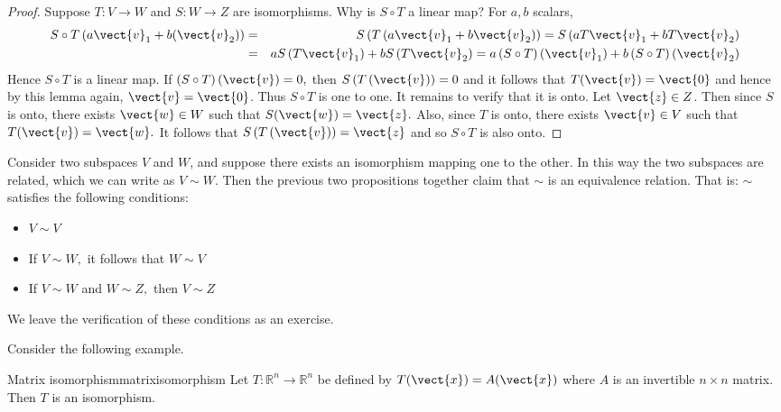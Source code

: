\begin{proof}
Suppose $T:V\rightarrow W$ and  $S:W\rightarrow Z$ are isomorphisms. Why is $S\circ T$ a linear map?
For $a,b$ scalars,
\begin{eqnarray*}
S\circ T\left( a\vect{v}_{1}+b(\vect{v}_{2})\right) 
&=& S\left( T\left(a\vect{v}_{1}+b\vect{v}_{2}\right) \right) =S\left( aT\vect{v}_{1}+bT\vect{v}_{2}\right) \\
&=&aS\left( T\vect{v}_{1}\right) +bS\left( T\vect{v}_{2}\right) = a\left( S\circ
T\right) \left( \vect{v}_{1}\right) +b\left( S\circ T\right) \left( \vect{v}_{2}\right)
\end{eqnarray*}
Hence $S\circ T$ is a linear map. If $\left( S\circ T\right) \left( \vect{v} \right)
=0,$ then $S\left( T\left(  \vect{v} \right) \right) =0$ and it follows that $T(\vect{v})=\vect{0}$ and hence by this lemma again, $\vect{v}=\vect{0}$. Thus $S\circ
T $ is one to one. It remains to verify that it is onto. Let $\vect{z} \in Z$. Then
since $S$ is onto, there exists $\vect{w} \in W$ such that $S(\vect{w})=\vect{z}.$ Also, since $T$
is onto, there exists $\vect{v}\in V$ such that $T(\vect{v})=\vect{w}.$ It follows that $S\left(
T\left( \vect{v}\right) \right) =\vect{z}$ and so $S\circ T$ is also onto.
\end{proof}

Consider two subspaces $V$ and $W$, and suppose there exists an isomorphism mapping one to the other. In this way the two subspaces are related, which we can write as $V \sim W$. Then the previous two propositions together claim that $\sim $ is an equivalence relation. That is: $\sim $
satisfies the following conditions:

\begin{itemize}
\item $V\sim V$

\item If $V\sim W,$ it follows that $W\sim V$

\item If $V\sim W$ and $W\sim Z,$ then $V\sim Z$
\end{itemize}

We leave the verification of these conditions as an exercise.

Consider the following example. 

\begin{example}{Matrix isomorphism}{matrixisomorphism}
Let $T:\mathbb{R}^{n}\rightarrow \mathbb{R}^{n}$ be defined by $T(\vect{x}) = A(\vect{x})$ where $A$ is an invertible $n\times n$ matrix. Then $T$ is
an isomorphism.
\end{example}

